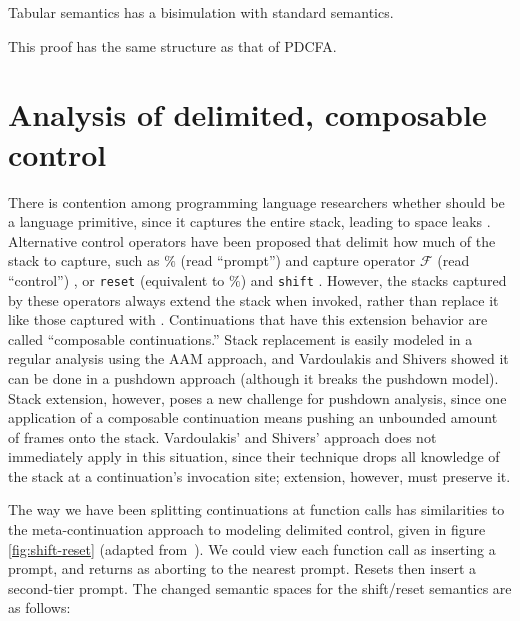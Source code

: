 \begin{theorem}\label{thm:cfa2}
  Tabular semantics has a bisimulation with standard semantics.
\end{theorem}
This proof has the same structure as that of PDCFA.

\section{Analysis of delimited, composable control}
\label{sec:sr}


There is contention among programming language researchers whether  should be a language primitive, since it captures the entire stack, leading to space leaks \citep{ianjohnson:kiselyov:against-callcc}.
%
Alternative control operators have been proposed that delimit how much of the stack to capture, such as $\%$ (read ``prompt'') and capture operator ${\mathcal F}$ (read ``control'') \citep{ianjohnson:felleisen:control:1988}, or \texttt{reset} (equivalent to $\%$) and \texttt{shift} \citep{ianjohnson:danvy:filinski:delim:1990}.
%
However, the stacks captured by these operators always extend the stack when invoked, rather than replace it like those captured with .
%
Continuations that have this extension behavior are called ``composable continuations.''
%
Stack replacement is easily modeled in a regular analysis using the AAM approach, and Vardoulakis and Shivers showed it can be done in a pushdown approach (although it breaks the pushdown model).
%
Stack extension, however, poses a new challenge for pushdown analysis, since one application of a composable continuation means pushing an unbounded amount of frames onto the stack.
%
Vardoulakis' and Shivers' approach does not immediately apply in this situation, since their technique drops all knowledge of the stack at a continuation's invocation site; extension, however, must preserve it.

The way we have been splitting continuations at function calls has similarities to the meta-continuation approach to modeling delimited control, given in figure \ref{fig:shift-reset} (adapted from~\citep{ianjohnson:Biernacki2006274}).
%
We could view each function call as inserting a prompt, and returns as aborting to the nearest prompt.
%
Resets then insert a second-tier prompt.
%
The changed semantic spaces for the shift/reset semantics are as follows:

